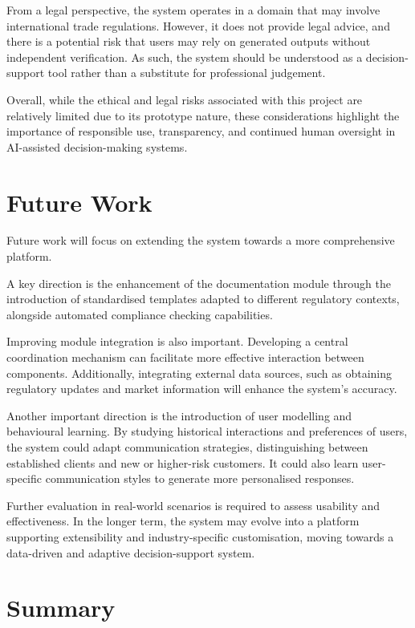 \documentclass[12pt,a4paper]{report}
\begin{document}
From a legal perspective, the system operates in a domain that may involve international trade regulations. However, it does not provide legal advice, and there is a potential risk that users may rely on generated outputs without independent verification. As such, the system should be understood as a decision-support tool rather than a substitute for professional judgement.

Overall, while the ethical and legal risks associated with this project are relatively limited due to its prototype nature, these considerations highlight the importance of responsible use, transparency, and continued human oversight in AI-assisted decision-making systems.

\section{Future Work}

Future work will focus on extending the system towards a more comprehensive platform.

A key direction is the enhancement of the documentation module through the introduction of standardised templates adapted to different regulatory contexts, alongside automated compliance checking capabilities.

Improving module integration is also important. Developing a central coordination mechanism can facilitate more effective interaction between components. Additionally, integrating external data sources, such as obtaining regulatory updates and market information will enhance the system's accuracy.

Another important direction is the introduction of user modelling and behavioural learning. By studying historical interactions and preferences of users, the system could adapt communication strategies, distinguishing between established clients and new or higher-risk customers. It could also learn user-specific communication styles to generate more personalised responses.

Further evaluation in real-world scenarios is required to assess usability and effectiveness. In the longer term, the system may evolve into a platform supporting extensibility and industry-specific customisation, moving towards a data-driven and adaptive decision-support system.

\section{Summary}
\end{document}
